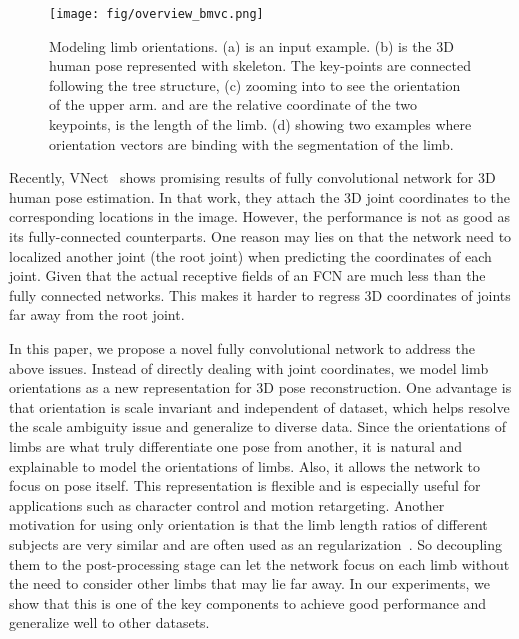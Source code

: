 \documentclass{bmvc2k}
\begin{document}
\begin{figure}[!t]
	\begin{center}
		\texttt{[image: fig/overview\_bmvc.png]}
	\end{center}
	\caption{Modeling limb orientations. 
		(a) is an input example. 
		(b) is the 3D human pose represented with skeleton. The key-points are connected following the tree structure,
		(c) zooming into to see the orientation of the upper arm. 
		 and  are the relative coordinate of the two keypoints,  is the length of the limb.
		(d) showing two examples where orientation vectors are binding with the segmentation of the limb.
	}
	\label{fig:firstpage}
\end{figure}
Recently, VNect~\cite{VNect_SIGGRAPH2017} shows promising results of fully convolutional network for 3D human pose estimation. In that work, they attach the 3D joint coordinates to the corresponding locations in the image. However, the performance is not as good as its fully-connected counterparts. One reason may lies on that the network need to localized another joint (the root joint) when predicting the coordinates of each joint. Given that the actual receptive fields of an FCN are much less than the fully connected networks. This makes it harder to regress 3D coordinates of joints far away from the root joint. 

In this paper, we propose a novel fully convolutional network to address the above issues. Instead of directly dealing with joint coordinates, we model limb orientations as a new representation for 3D pose reconstruction. One advantage is that orientation is scale invariant and independent of dataset, which helps resolve the scale ambiguity issue and generalize to diverse data. Since the orientations of limbs are what truly differentiate one pose from another, it is natural and explainable to model the orientations of limbs. Also, it allows the network to focus on pose itself. This representation is flexible and is especially useful for applications such as character control and motion retargeting. Another motivation for using only orientation is that the limb length ratios of different subjects are very similar and are often used as an regularization~\cite{wang2014robust,zhou2017weakly}. So decoupling them to the post-processing stage can let the network focus on each limb without the need to consider other limbs that may lie far away. In our experiments, we show that this is one of the key components to achieve good performance and generalize well to other datasets.  
\end{document}
